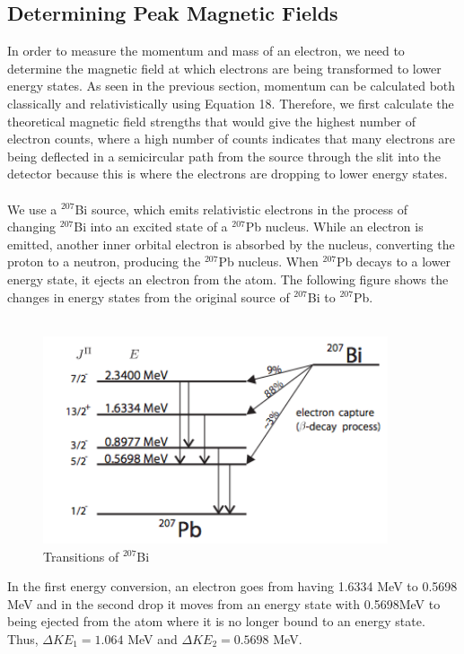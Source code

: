 \subsection{Determining Peak Magnetic Fields}
In order to measure the momentum and mass of an electron, we need to determine the magnetic field at which electrons are being transformed to lower energy states. As seen in the previous section, momentum can be calculated both classically and relativistically using Equation 18. Therefore, we first calculate the theoretical magnetic field strengths that would give the highest number of electron counts, where a high number of counts indicates that many electrons are being deflected in a semicircular path from the source through the slit into the detector because this is where the electrons are dropping to lower energy states. \\ \\
We use a $^{207}$Bi source, which emits relativistic electrons in the process of changing $^{207}$Bi into an excited state of a $^{207}$Pb nucleus. While an electron is emitted, another inner orbital electron is absorbed by the nucleus, converting the proton to a neutron, producing the $^{207}$Pb nucleus. When $^{207}$Pb decays to a lower energy state, it ejects an electron from the atom. The following figure shows the changes in energy states from the original source of $^{207}$Bi to $^{207}$Pb. \\
\\
\begin{figure}[H]
\begin{center}
\includegraphics[width=4in]{energylevels.png}
\caption{Transitions of $^{207}$Bi}
\end{center}
\end{figure}
\medskip
In the first energy conversion, an electron goes from having 1.6334 MeV to 0.5698 MeV and in the second drop it moves from an energy state with 0.5698MeV to being ejected from the atom where it is no longer bound to an energy state. Thus, $\Delta KE_1=1.064$ MeV and $\Delta KE_2= 0.5698$ MeV. \\
